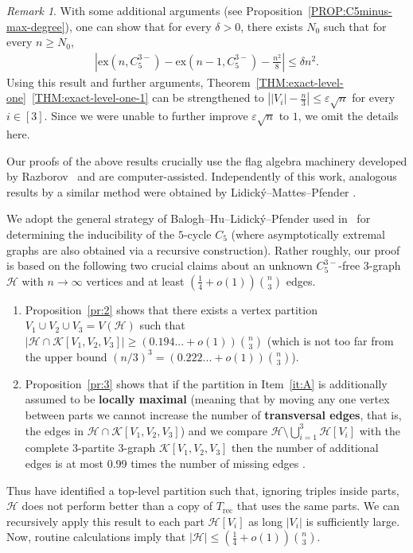 \documentclass[11pt,a4paper]{article}
\theoremstyle{remark}
\newtheorem{remark}[definition]{Remark}
\newcommand{\C}[1]{\mathcal{#1}}
\begin{document}
\begin{remark}
    With some additional arguments (see Proposition~\ref{PROP:C5minus-max-degree}), one can show that for every $\delta > 0$, there exists $N_0$ such that for every $n \ge N_0$, 
    \begin{align}\label{equ:smoothness-C5-}
        \left|\mathrm{ex}(n,C_{5}^{3-}) - \mathrm{ex}(n-1,C_{5}^{3-}) - \frac{n^2}{8}\right| 
        \le \delta n^2. 
    \end{align}
    Using this result and further arguments, Theorem~\ref{THM:exact-level-one}~\ref{THM:exact-level-one-1} can be strengthened to 
    $\left||V_i| - \frac{n}{3}\right| \le \varepsilon \sqrt{n}$ for every $i \in [3]$. 
    Since we were unable to further improve $\varepsilon \sqrt{n}$ to $1$, we omit the details here. 
\end{remark}

Our proofs of the above results crucially use the flag algebra machinery developed by Razborov~\cite{Raz07} and are computer-assisted. Independently of this work, analogous results by a similar method were obtained by Lidick\'y--Mattes--Pfender \cite{LMP24}. 



We adopt the general strategy of Balogh--Hu--Lidick{\'y}--Pfender used in~\cite{BHLP16C5} for determining the inducibility of the $5$-cycle $C_5$ (where asymptotically extremal graphs are also obtained via a recursive construction). Rather roughly, our proof is based on the following two crucial claims about an unknown $C_{5}^{3-}$-free $3$-graph $\C H$ with $n\to\infty$ vertices and at least $(\frac14+o(1)){n\choose 3}$ edges.
 \begin{enumerate}
 \item\label{it:A} Proposition~\ref{pr:2} shows that there exists a vertex partition $V_1\cup V_2\cup V_3=V(\C H)$ such that $|\C H\cap \C K[V_1,V_2,V_3]|\ge(0.194...+o(1)){n\choose 3}$ (which is not too far from the upper bound $(n/3)^3=(0.222...+o(1)) {n\choose 3}$).
 \item\label{it:B} Proposition~\ref{pr:3} shows that if the partition in Item~\ref{it:A} is additionally assumed to be \textbf{locally maximal} (meaning that by moving any one vertex between parts we cannot increase the number of \textbf{transversal edges}, that is, the edges in $\C H\cap \mathcal{K}[V_1,V_2,V_3]$) and we compare $\C H\setminus\bigcup_{i=1}^3\C H[V_i]$ with the complete 3-partite $3$-graph $\mathcal{K}[V_1,V_2,V_3]$ 
 then the number of additional edges is at most 0.99 times the number of missing edges%
 .
\end{enumerate}
 Thus have identified a top-level partition such that, ignoring triples inside parts, $\C H$ does not perform better than a copy of $T_{\mathrm{rec}}$ that uses the same parts. We can recursively apply this result to each part $\C H[V_i]$ as long $|V_i|$ is sufficiently large. Now, routine calculations imply that $|\C H|\le (\frac14+o(1)){n\choose 3}$.
\end{document}
